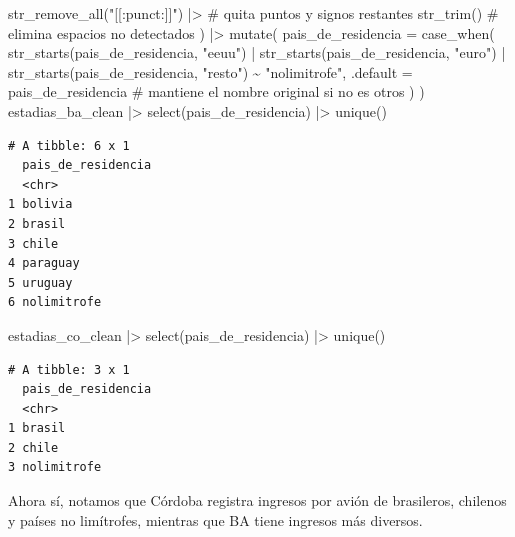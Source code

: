 \documentclass[
  spanish,
  letterpaper,
  DIV=11,
  numbers=noendperiod]{scrartcl}
\newenvironment{Shaded}{\begin{snugshade}}{\end{snugshade}}
\newcommand{\AttributeTok}[1]{\textcolor[rgb]{0.40,0.45,0.13}{#1}}
\newcommand{\CommentTok}[1]{\textcolor[rgb]{0.37,0.37,0.37}{#1}}
\newcommand{\FunctionTok}[1]{\textcolor[rgb]{0.28,0.35,0.67}{#1}}
\newcommand{\NormalTok}[1]{\textcolor[rgb]{0.00,0.23,0.31}{#1}}
\newcommand{\SpecialCharTok}[1]{\textcolor[rgb]{0.37,0.37,0.37}{#1}}
\newcommand{\StringTok}[1]{\textcolor[rgb]{0.13,0.47,0.30}{#1}}
\begin{document}
\begin{Shaded}
\begin{Highlighting}[]
           \FunctionTok{str\_remove\_all}\NormalTok{(}\StringTok{"[[:punct:]]"}\NormalTok{) }\SpecialCharTok{|\textgreater{}} \CommentTok{\# quita puntos y signos restantes}
           \FunctionTok{str\_trim}\NormalTok{() }\CommentTok{\# elimina espacios no detectados}
\NormalTok{  ) }\SpecialCharTok{|\textgreater{}} 
  \FunctionTok{mutate}\NormalTok{(}
    \AttributeTok{pais\_de\_residencia =} \FunctionTok{case\_when}\NormalTok{(}
      \FunctionTok{str\_starts}\NormalTok{(pais\_de\_residencia, }\StringTok{"eeuu"}\NormalTok{) }\SpecialCharTok{|} 
      \FunctionTok{str\_starts}\NormalTok{(pais\_de\_residencia, }\StringTok{"euro"}\NormalTok{) }\SpecialCharTok{|} 
      \FunctionTok{str\_starts}\NormalTok{(pais\_de\_residencia, }\StringTok{"resto"}\NormalTok{) }\SpecialCharTok{\textasciitilde{}} \StringTok{"nolimitrofe"}\NormalTok{,}
      \AttributeTok{.default =}\NormalTok{ pais\_de\_residencia }\CommentTok{\# mantiene el nombre original si no es \textquotesingle{}otros\textquotesingle{}}
\NormalTok{    )}
\NormalTok{  )}
\NormalTok{estadias\_ba\_clean }\SpecialCharTok{|\textgreater{}} \FunctionTok{select}\NormalTok{(pais\_de\_residencia) }\SpecialCharTok{|\textgreater{}} \FunctionTok{unique}\NormalTok{()}
\end{Highlighting}
\end{Shaded}

\begin{verbatim}
# A tibble: 6 x 1
  pais_de_residencia
  <chr>             
1 bolivia           
2 brasil            
3 chile             
4 paraguay          
5 uruguay           
6 nolimitrofe       
\end{verbatim}

\begin{Shaded}
\begin{Highlighting}[]
\NormalTok{estadias\_co\_clean }\SpecialCharTok{|\textgreater{}} \FunctionTok{select}\NormalTok{(pais\_de\_residencia) }\SpecialCharTok{|\textgreater{}} \FunctionTok{unique}\NormalTok{()}
\end{Highlighting}
\end{Shaded}

\begin{verbatim}
# A tibble: 3 x 1
  pais_de_residencia
  <chr>             
1 brasil            
2 chile             
3 nolimitrofe       
\end{verbatim}

Ahora sí, notamos que Córdoba registra ingresos por avión de brasileros,
chilenos y países no limítrofes, mientras que BA tiene ingresos más
diversos.
\end{document}
